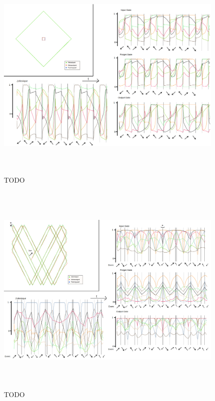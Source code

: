 \begin{figure}
	\centering
	\includegraphics[width=\textwidth, height=400px]{pics/act3.png}	
	\caption{TODO }
	\label{img:act3}
\end{figure}
\begin{figure}
	\centering
	\includegraphics[width=\textwidth, height=400px]{pics/act4.png}	
	\caption{TODO }
	\label{img:act4}
\end{figure}







